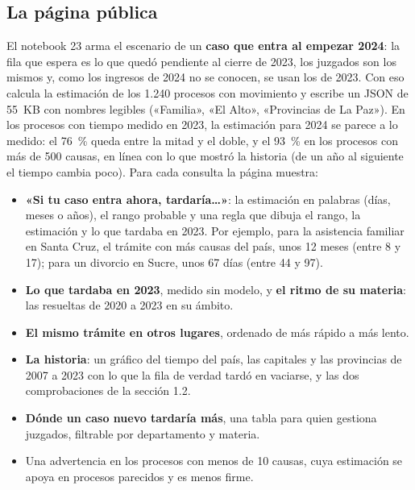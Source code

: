 \documentclass[11pt,a4paper]{article}
\begin{document}
\begin{table}[H]
  \centering\small
  \caption{El rango probable según el tamaño del proceso: la estimación se multiplica por estos factores. Notebook 22.}
  \label{tab:bandas}
  
\end{table}

\subsection{La página pública}

El notebook 23 arma el escenario de un \textbf{caso que entra al empezar 2024}: la fila que espera es lo que quedó
pendiente al cierre de 2023, los juzgados son los mismos y, como los ingresos de 2024 no se conocen, se usan los de 2023.
Con eso calcula la estimación de los 1.240 procesos con movimiento y escribe un JSON de 55~KB con nombres legibles
(«Familia», «El Alto», «Provincias de La Paz»). En los procesos con tiempo medido en 2023, la estimación para 2024 se
parece a lo medido: el 76~\% queda entre la mitad y el doble, y el 93~\% en los procesos con más de 500 causas, en línea con
lo que mostró la historia (de un año al siguiente el tiempo cambia poco). Para cada consulta la página muestra:

\begin{itemize}
  \item \textbf{«Si tu caso entra ahora, tardaría…»}: la estimación en palabras (días, meses o años), el rango probable
  y una regla que dibuja el rango, la estimación y lo que tardaba en 2023. Por ejemplo, para la asistencia familiar en
  Santa Cruz, el trámite con más causas del país, unos 12 meses (entre 8 y 17); para un divorcio en Sucre, unos 67 días
  (entre 44 y 97).
  \item \textbf{Lo que tardaba en 2023}, medido sin modelo, y \textbf{el ritmo de su materia}: las resueltas de 2020 a
  2023 en su ámbito.
  \item \textbf{El mismo trámite en otros lugares}, ordenado de más rápido a más lento.
  \item \textbf{La historia}: un gráfico del tiempo del país, las capitales y las provincias de 2007 a 2023 con lo que la
  fila de verdad tardó en vaciarse, y las dos comprobaciones de la sección 1.2.
  \item \textbf{Dónde un caso nuevo tardaría más}, una tabla para quien gestiona juzgados, filtrable por departamento y
  materia.
  \item Una advertencia en los procesos con menos de 10 causas, cuya estimación se apoya en procesos parecidos y es
  menos firme.
\end{itemize}
\end{document}
